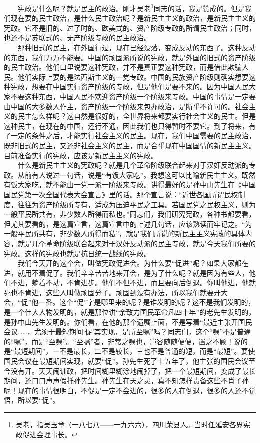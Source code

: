 \documentclass[cn,11pt,chinese]{elegantbook}
\begin{document}
　　宪政是什么呢？就是民主的政治。刚才吴老\footnote[1]{ 吴老，指吴玉章（一八七八——一九六六），四川荣县人。当时任延安各界宪政促进会理事长。}同志的话，我是赞成的。但是我们现在要的民主政治，是什么民主政治呢？是新民主主义的政治，是新民主主义的宪政。它不是旧的、过了时的、欧美式的、资产阶级专政的所谓民主政治；同时，也还不是苏联式的、无产阶级专政的民主政治。\\
　　那种旧式的民主，在外国行过，现在已经没落，变成反动的东西了。这种反动的东西，我们万万不能要。中国的顽固派所说的宪政，就是外国的旧式的资产阶级的民主政治。他们口里说要这种宪政，并不是真正要这种宪政，而是借此欺骗人民。他们实际上要的是法西斯主义的一党专政。中国的民族资产阶级则确实想要这种宪政，想要在中国实行资产阶级的专政，但是他们是要不来的。因为中国人民大家不要这种东西，中国人民不欢迎资产阶级一个阶级来专政。中国的事情是一定要由中国的大多数人作主，资产阶级一个阶级来包办政治，是断乎不许可的。社会主义的民主怎么样呢？这自然是很好的，全世界将来都要实行社会主义的民主。但是这种民主，在现在的中国，还行不通，因此我们也只得暂时不要它。到了将来，有了一定的条件之后，才能实行社会主义的民主。现在，我们中国需要的民主政治，既非旧式的民主，又还非社会主义的民主，而是合乎现在中国国情的新民主主义。目前准备实行的宪政，应该是新民主主义的宪政。\\
　　什么是新民主主义的宪政呢？就是几个革命阶级联合起来对于汉奸反动派的专政。从前有人说过一句话，说是“有饭大家吃”。我想这可以比喻新民主主义。既然有饭大家吃，就不能由一党一派一阶级来专政。讲得最好的是孙中山先生在《中国国民党第一次全国代表大会宣言》里的话。那个宣言说：“近世各国所谓民权制度，往往为资产阶级所专有，适成为压迫平民之工具。若国民党之民权主义，则为一般平民所共有，非少数人所得而私也。”同志们，我们研究宪政，各种书都要看，但尤其要看的，是这篇宣言，这篇宣言中的上述几句话，应该熟读而牢记之。“为一般平民所共有，非少数人所得而私”，就是我们所说的新民主主义宪政的具体内容，就是几个革命阶级联合起来对于汉奸反动派的民主专政，就是今天我们所要的宪政。这样的宪政也就是抗日统一战线的宪政。\\
　　我们今天开的这个会，叫做宪政促进会。为什么要“促进”呢？如果大家都在进，就用不着促了。我们辛辛苦苦地来开会，是为了什么呢？就是因为有些人，他们不进，躺着不动，不肯进步。他们不但不进，而且要向后倒退。你叫他进，他就死也不肯进，这些人叫做顽固分子。顽固到没有办法，所以我们就要开大会，“促”他一番。这个“促”字是哪里来的呢？是谁发明的呢？这不是我们发明的，是一个伟大人物发明的，就是那位讲“余致力国民革命凡四十年”的老先生发明的，是孙中山先生发明的。你们看，在他的那个遗嘱上面，不是写着“最近主张开国民会议……，尤须于最短期间‘促’其实现，是所至嘱”吗？同志们，这个“嘱”不是普通的“嘱”，而是“至嘱”。“至嘱”者，非常之嘱也，岂容随随便便，置之不顾！说的是“最短期间”，一不是最长，二不是较长，三也不是普通的短，而是“最短”。要使国民会议在最短期间实现，就要“促”。孙先生死了十五年了，他主张的国民会议至今没有开。天天闹训政，把时间糊里糊涂地闹掉了，把一个最短期间，变成了最长期间，还口口声声假托孙先生。孙先生在天之灵，真不知怎样责备这些不肖子孙呢！现在的事情很明白，不促是一定不会进的，很多的人在倒退，很多的人还不觉悟，所以要“促”。\\
\end{document}
